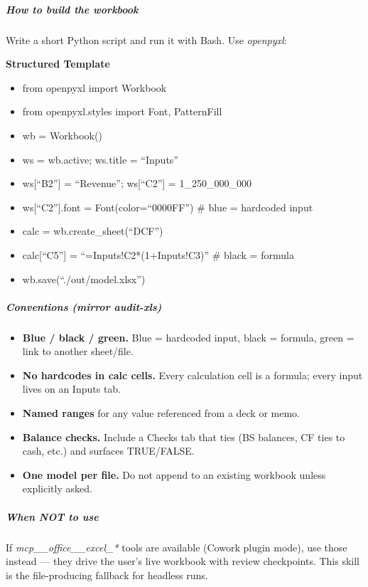 \documentclass[11pt]{article}
\begin{document}
\subparagraph{How to build the workbook}\mbox{}\par

Write a short Python script and run it with Bash. Use \emph{openpyxl}:


\textbf{Structured Template}
\begin{itemize}[leftmargin=*,itemsep=2pt,topsep=2pt]
\item {} from openpyxl import Workbook
\item {} from openpyxl.styles import Font, PatternFill
\item {} wb = Workbook()
\item {} ws = wb.active; ws.title = ``Inputs''
\item {} ws[``B2''] = ``Revenue''; ws[``C2''] = 1\_\allowbreak{}250\_\allowbreak{}000\_\allowbreak{}000
\item {} ws[``C2''].font = Font(color=``0000FF'') \# blue = hardcoded input
\item {} calc = wb.create\_\allowbreak{}sheet(``DCF'')
\item {} calc[``C5''] = ``=Inputs!C2*(1+Inputs!C3)'' \# black = formula
\item {} wb.save(``./out/model.xlsx'')
\end{itemize}

\subparagraph{Conventions (mirror \emph{audit-xls})}\mbox{}\par

\begin{itemize}[leftmargin=*,itemsep=2pt,topsep=2pt]
\item {} \textbf{Blue / black / green.} Blue = hardcoded input, black = formula, green = link to another sheet/file.
\item {} \textbf{No hardcodes in calc cells.} Every calculation cell is a formula; every input lives on an Inputs tab.
\item {} \textbf{Named ranges} for any value referenced from a deck or memo.
\item {} \textbf{Balance checks.} Include a Checks tab that ties (BS balances, CF ties to cash, etc.) and surfaces TRUE/FALSE.
\item {} \textbf{One model per file.} Do not append to an existing workbook unless explicitly asked.
\end{itemize}

\subparagraph{When NOT to use}\mbox{}\par

If \emph{mcp\_\allowbreak{}\_\allowbreak{}office\_\allowbreak{}\_\allowbreak{}excel\_\allowbreak{}*} tools are available (Cowork plugin mode), use those instead — they drive the user's live workbook with review checkpoints. This skill is the file-producing fallback for headless runs.
\end{document}
